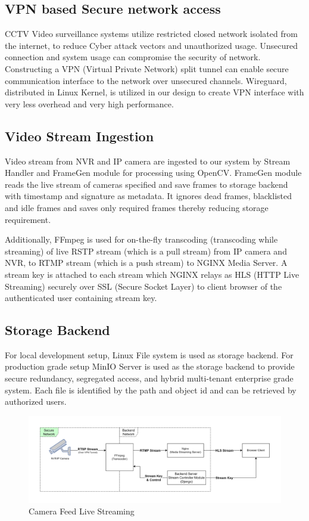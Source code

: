 \subsection{VPN based Secure network access}
CCTV Video surveillance systems utilize restricted closed network isolated from the internet, to reduce Cyber attack vectors and unauthorized usage. Unsecured connection and system usage can compromise the security of network. 
Constructing a VPN (Virtual Private Network) split tunnel can enable secure communication interface to the network over unsecured channels. Wireguard, distributed in Linux Kernel, is utilized in our design to create VPN interface with very less overhead and very high performance.

\subsection{Video Stream Ingestion}
Video stream from NVR and IP camera are ingested to our system by Stream Handler and FrameGen module for processing using OpenCV. FrameGen module reads the live stream of cameras specified and save frames to storage backend with timestamp and signature as metadata. It ignores dead frames, blacklisted and idle frames and saves only required frames thereby reducing storage requirement.

Additionally, FFmpeg is used for on-the-fly transcoding (transcoding while streaming) of live RSTP stream (which is a pull stream) from IP camera and NVR, to RTMP stream (which is a push stream) to NGINX Media Server. A stream key is attached to each stream which NGINX relays as HLS (HTTP Live Streaming) securely over SSL (Secure Socket Layer) to client browser of the authenticated user containing stream key.   

\subsection{Storage Backend}
For local development setup, Linux File system is used as storage backend. For production grade setup MinIO Server is used as the storage backend to provide secure redundancy, segregated access, and hybrid multi-tenant enterprise grade system. Each file is identified by the path and object id and can be retrieved by authorized users. 


\begin{figure}[ht!]
	\centering
	\includegraphics[width=0.8\linewidth]{Images/live_stream_arch}
	\caption{Camera Feed Live Streaming}
	\label{fig:livestreamarch}
\end{figure}

